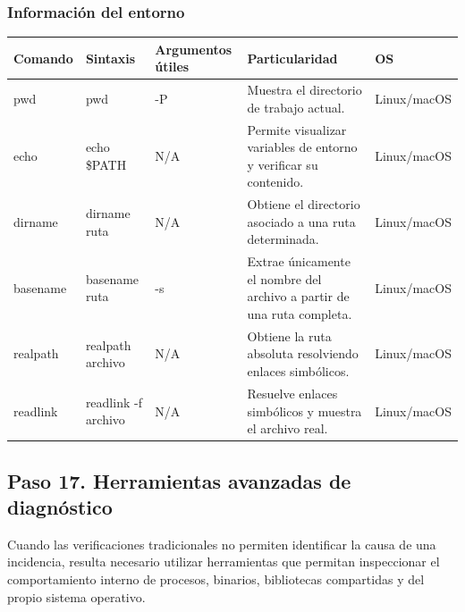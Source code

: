 \documentclass[a4paper,10pt]{article}
\begin{document}

\subsubsection{Información del entorno}

\begin{longtable}{|p{2.8cm}|p{3.3cm}|p{4cm}|p{5.3cm}|p{1.5cm}|}

\hline
Comando &
Sintaxis &
Argumentos útiles &
Particularidad &
OS
\\
\hline
\endhead

pwd &
pwd &
-P &
Muestra el directorio de trabajo actual. &
Linux/macOS
\\
\hline

echo &
echo \$PATH &
N/A &
Permite visualizar variables de entorno y verificar su contenido. &
Linux/macOS
\\
\hline

dirname &
dirname ruta &
N/A &
Obtiene el directorio asociado a una ruta determinada. &
Linux/macOS
\\
\hline

basename &
basename ruta &
-s &
Extrae únicamente el nombre del archivo a partir de una ruta completa. &
Linux/macOS
\\
\hline

realpath &
realpath archivo &
N/A &
Obtiene la ruta absoluta resolviendo enlaces simbólicos. &
Linux/macOS
\\
\hline

readlink &
readlink -f archivo &
N/A &
Resuelve enlaces simbólicos y muestra el archivo real. &
Linux/macOS
\\
\hline

\end{longtable}


\subsection{Paso 17. Herramientas avanzadas de diagnóstico}

Cuando las verificaciones tradicionales no permiten identificar la causa de una
incidencia, resulta necesario utilizar herramientas que permitan inspeccionar
el comportamiento interno de procesos, binarios, bibliotecas compartidas y del
propio sistema operativo.
\end{document}
